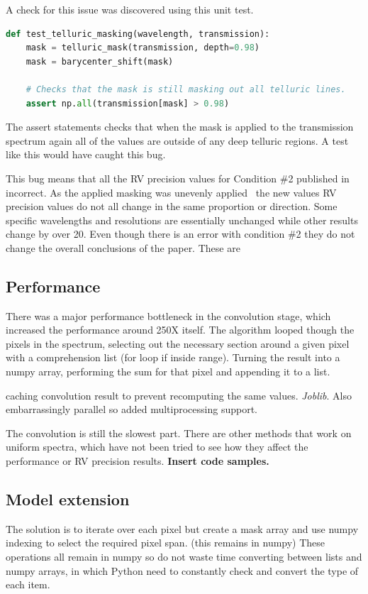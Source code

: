 A check for this issue was discovered using this unit test.
\begin{lstlisting}[language=Python, caption=Example unit test to catch masking bug.]
def test_telluric_masking(wavelength, transmission):
    mask = telluric_mask(transmission, depth=0.98)
    mask = barycenter_shift(mask)

    # Checks that the mask is still masking out all telluric lines.
    assert np.all(transmission[mask] > 0.98)
\end{lstlisting}
The assert statements checks that when the mask is applied to the transmission spectrum again all of the values are outside of any deep telluric regions. A test like this would have caught this bug.

This bug means that all the RV precision values for Condition \#2 published in~\citet{figueira_radial_2016} incorrect. As the applied masking was unevenly applied~\citet{figueira_radial_2016} the new values RV precision values do not all change in the same proportion or direction. Some specific wavelengths and resolutions are essentially unchanged while other results change by over 20\mps.  Even though there is an error with condition \#2 they do not change the overall conclusions of the paper. These are 

 \subsection{Performance}
    There was a major performance bottleneck in the convolution stage, which increased the performance around 250X itself. The algorithm looped though the pixels in the spectrum, selecting out the necessary section around a given pixel with a comprehension list (for loop if inside range). Turning the result into a numpy array, performing the sum for that pixel and appending it to a list.


caching convolution result to prevent recomputing the same values. \emph{Joblib}.  Also embarrassingly parallel so added multiprocessing support.

The convolution is still the slowest part. There are other methods that work on uniform spectra, which have not been tried to see how they affect the performance or RV precision results.
\textbf{Insert code samples.}


\subsection{Model extension}
The solution is to iterate over each pixel but create a mask array and use numpy indexing to select the required pixel span. (this remains in numpy)
These operations all remain in numpy so do not waste time converting between lists and numpy arrays, in which Python need to constantly check and convert the type of each item.


